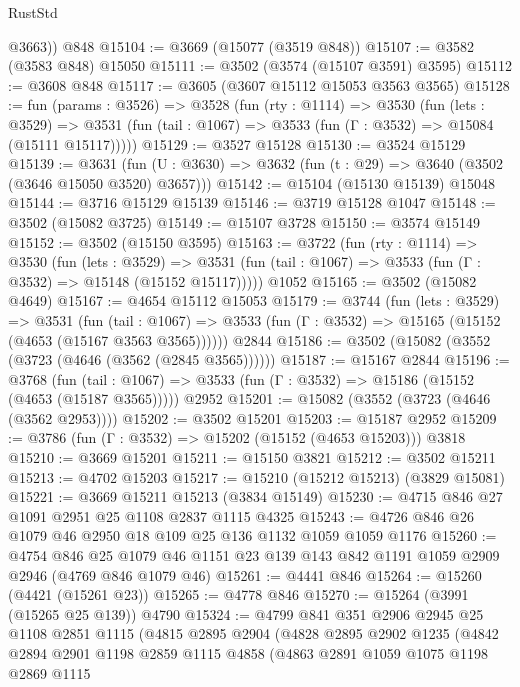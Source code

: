 \begin{lexlean}{RustStd}
\begin{coremodule}
        @3663))
    @848
@15104 := @3669 (@15077 (@3519 @848))
@15107 := @3582 (@3583 @848) @15050
@15111 := @3502 (@3574 (@15107 @3591) @3595)
@15112 := @3608 @848
@15117 := @3605 (@3607 @15112 @15053 @3563 @3565)
@15128 := fun (params : @3526) =>
  @3528
    (fun (rty : @1114) =>
    @3530
      (fun (lets : @3529) =>
      @3531 (fun (tail : @1067) => @3533 (fun (Γ : @3532) => @15084 (@15111 @15117)))))
@15129 := @3527 @15128
@15130 := @3524 @15129
@15139 := @3631
    (fun (U : @3630) => @3632 (fun (t : @29) => @3640 (@3502 (@3646 @15050 @3520) @3657)))
@15142 := @15104 (@15130 @15139) @15048
@15144 := @3716 @15129 @15139
@15146 := @3719 @15128 @1047
@15148 := @3502 (@15082 @3725)
@15149 := @15107 @3728
@15150 := @3574 @15149
@15152 := @3502 (@15150 @3595)
@15163 := @3722
    (fun (rty : @1114) =>
    @3530
      (fun (lets : @3529) =>
      @3531 (fun (tail : @1067) => @3533 (fun (Γ : @3532) => @15148 (@15152 @15117)))))
    @1052
@15165 := @3502 (@15082 @4649)
@15167 := @4654 @15112 @15053
@15179 := @3744
    (fun (lets : @3529) =>
    @3531
      (fun (tail : @1067) =>
      @3533 (fun (Γ : @3532) => @15165 (@15152 (@4653 (@15167 @3563 @3565))))))
    @2844
@15186 := @3502 (@15082 (@3552 (@3723 (@4646 (@3562 (@2845 @3565))))))
@15187 := @15167 @2844
@15196 := @3768
    (fun (tail : @1067) => @3533 (fun (Γ : @3532) => @15186 (@15152 (@4653 (@15187 @3565)))))
    @2952
@15201 := @15082 (@3552 (@3723 (@4646 (@3562 @2953))))
@15202 := @3502 @15201
@15203 := @15187 @2952
@15209 := @3786 (fun (Γ : @3532) => @15202 (@15152 (@4653 @15203))) @3818
@15210 := @3669 @15201
@15211 := @15150 @3821
@15212 := @3502 @15211
@15213 := @4702 @15203
@15217 := @15210 (@15212 @15213) (@3829 @15081)
@15221 := @3669 @15211 @15213 (@3834 @15149)
@15230 := @4715 @846 @27 @1091 @2951 @25 @1108 @2837 @1115 @4325
@15243 := @4726 @846 @26 @1079 @46 @2950 @18 @109 @25 @136 @1132 @1059 @1059 @1176
@15260 := @4754
    @846
    @25
    @1079
    @46
    @1151
    @23
    @139
    @143
    @842
    @1191
    @1059
    @2909
    @2946
    (@4769 @846 @1079 @46)
@15261 := @4441 @846
@15264 := @15260 (@4421 (@15261 @23))
@15265 := @4778 @846
@15270 := @15264 (@3991 (@15265 @25 @139)) @4790
@15324 := @4799
    @841
    @351
    @2906
    @2945
    @25
    @1108
    @2851
    @1115
    (@4815
      @2895
      @2904
      (@4828
        @2895
        @2902
        @1235
        (@4842
          @2894
          @2901
          @1198
          @2859
          @1115
          @4858
          (@4863
            @2891
            @1059
            @1075
            @1198
            @2869
            @1115

\end{coremodule}
\end{lexlean}

